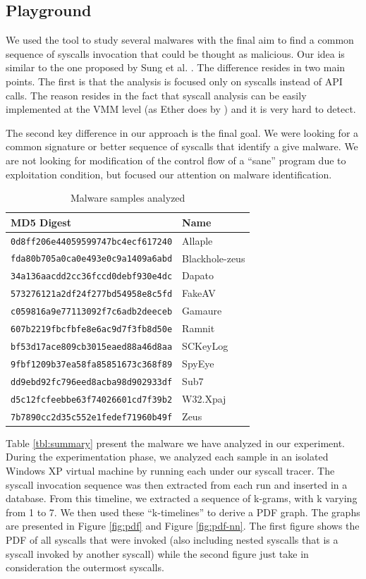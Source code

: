 \documentclass{article}
\begin{document}
\subsection{Playground}

We used the tool to study several malwares with the final aim to find a common sequence of syscalls invocation that could be thought as malicious. Our idea is similar to the one proposed by Sung et al. \cite{SAV}. The difference resides in two main points. The first is that the analysis is focused only on syscalls instead of API calls. The reason resides in the fact that syscall analysis can be easily implemented at the VMM level (as Ether does by ) and it is very hard to detect.

The second key difference in our approach is the final goal. We were looking for a common signature or better sequence of syscalls that identify a give malware. We are not looking for modification of the control flow of a ``sane'' program due to exploitation condition, but focused our attention on malware identification.

\begin{table}[h]
\centering
\begin{tabular}{|l|l|}
\hline
	MD5 Digest & Name \\
\hline
	\texttt{0d8ff206e44059599747bc4ecf617240} & Allaple \\
	\texttt{fda80b705a0ca0e493e0c9a1409a6abd} & Blackhole-zeus \\
	\texttt{34a136aacdd2cc36fccd0debf930e4dc} & Dapato \\
	\texttt{573276121a2df24f277bd54958e8c5fd} & FakeAV \\
	\texttt{c059816a9e77113092f7c6adb2deeceb} & Gamaure \\
	\texttt{607b2219fbcfbfe8e6ac9d7f3fb8d50e} & Ramnit \\
	\texttt{bf53d17ace809cb3015eaed88a46d8aa} & SCKeyLog \\
	\texttt{9fbf1209b37ea58fa85851673c368f89} & SpyEye \\
	\texttt{dd9ebd92fc796eed8acba98d902933df} & Sub7 \\
	\texttt{d5c12fcfeebbe63f74026601cd7f39b2} & W32.Xpaj \\
	\texttt{7b7890cc2d35c552e1fedef71960b49f} & Zeus \\
\hline
\end{tabular}
\caption{Malware samples analyzed}
\label{tab:summary}
\end{table}

Table \ref{tbl:summary} present the malware we have analyzed in our experiment. During the experimentation phase, we analyzed each sample in an isolated Windows XP virtual machine by running each under our syscall tracer. The syscall invocation sequence was then extracted from each run and inserted in a database. From this timeline, we extracted a sequence of k-grams, with k varying from 1 to 7. We then used these ``k-timelines'' to derive a PDF graph. The graphs are presented in Figure \ref{fig:pdf} and Figure \ref{fig:pdf-nn}. The first figure shows the PDF of all syscalls that were invoked (also including nested syscalls that is a syscall invoked by another syscall) while the second figure just take in consideration the outermost syscalls.
\end{document}
